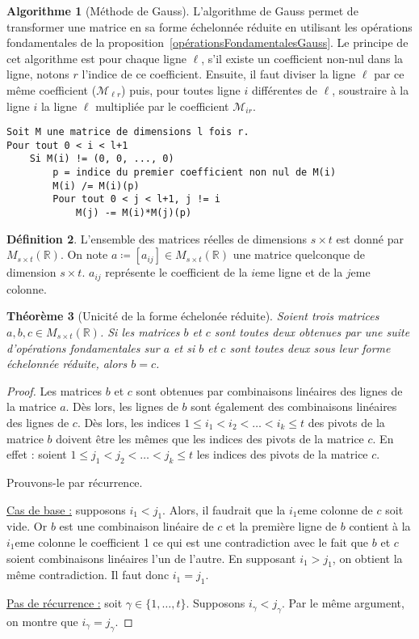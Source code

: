 \documentclass{article}
\newcommand{\R}{\mathbb R}
\newcommand{\M}[3]{M_{#1 \times #2}(#3)}
\newtheorem{thm}{Théorème}[section]
\theoremstyle{definition}
\newtheorem{alg}[thm]{Algorithme}
\newtheorem{déf}[thm]{Définition}
\theoremstyle{remark}
\begin{document}
		\begin{alg}[Méthode de Gauss]\label{algoGauss} L'algorithme de Gauss permet de transformer une matrice en sa forme échelonnée réduite en utilisant les opérations
		fondamentales de la proposition~\ref{opérationsFondamentalesGauss}. Le principe de cet algorithme est pour chaque ligne $\ell$, s'il existe un coefficient non-nul
		dans la ligne, notons $r$ l'indice de ce coefficient. Ensuite, il faut diviser la ligne $\ell$ par ce même coefficient ($\mathcal M_{\ell r}$) puis, pour toutes ligne
		$i$ différentes de $\ell$, soustraire à la ligne $i$ la ligne $\ell$ multipliée par le coefficient $\mathcal M_{i r}$.
\begin{verbatim}
Soit M une matrice de dimensions l fois r.
Pour tout 0 < i < l+1
    Si M(i) != (0, 0, ..., 0)
        p = indice du premier coefficient non nul de M(i)
        M(i) /= M(i)(p)
        Pour tout 0 < j < l+1, j != i
            M(j) -= M(i)*M(j)(p)
\end{verbatim}
		\end{alg}

		\begin{déf} L'ensemble des matrices réelles de dimensions $s \times t$ est donné par $M_{s \times t}(\R)$. On note $a \coloneqq [a_{ij}] \in M_{s \times t}(\R)$
		une matrice quelconque de dimension $s \times t$. $a_{ij}$ représente le coefficient de la $i$eme ligne et de la $j$eme colonne. \end{déf}

		\begin{thm}[Unicité de la forme échelonée réduite] Soient trois matrices $a, b, c \in \M st\R$. Si les matrices $b$ et $c$ sont toutes deux obtenues par une suite
		d'opérations fondamentales sur $a$ et si $b$ et $c$ sont toutes deux sous leur forme échelonnée réduite, alors $b = c$. \end{thm}

		\begin{proof} Les matrices $b$ et $c$ sont obtenues par combinaisons linéaires des lignes de la matrice $a$. Dès lors, les lignes de $b$ sont également des combinaisons
		linéaires des lignes de $c$. Dès lors, les indices $1 \leq i_1 < i_2 < \ldots < i_k \leq t$ des pivots de la matrice $b$ doivent être les mêmes que les indices
		des pivots de la matrice $c$. En effet : soient $1 \leq j_1 < j_2 < \ldots <  j_k \leq t$ les indices des pivots de la matrice $c$.

		Prouvons-le par récurrence. 
		
		\underline{Cas de base :} supposons $i_1 < j_1$. Alors, il faudrait que la $i_1$eme colonne de $c$ soit vide. Or $b$ est une combinaison linéaire de $c$ et la première
		ligne de $b$ contient à la $i_1$eme colonne le coefficient 1 ce qui est une contradiction avec le fait que $b$ et $c$ soient combinaisons linéaires l'un de l'autre.
		En supposant $i_1 > j_1$, on obtient la même contradiction. Il faut donc $i_1 = j_1$.
		
		\underline{Pas de récurrence :} soit $\gamma \in \{1, \ldots, t\}$. Supposons $i_\gamma < j_\gamma$. Par le même argument, on montre que $i_\gamma = j_\gamma$.
		\end{proof}
\end{document}
